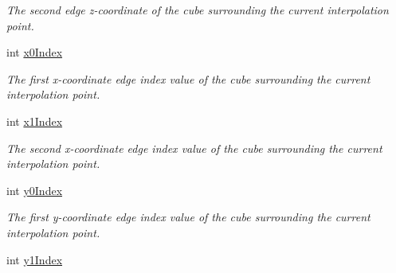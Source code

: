 \begin{DoxyCompactItemize}
\begin{DoxyCompactList}\small\item\em The second edge z-\/coordinate of the cube surrounding the current interpolation point. \item\end{DoxyCompactList}\item 
\hypertarget{classassignment_1_1_interpolator3_d_a5f5958cc28894f071c910f3a6950b4a7}{
int \hyperlink{classassignment_1_1_interpolator3_d_a5f5958cc28894f071c910f3a6950b4a7}{x0Index}}
\label{classassignment_1_1_interpolator3_d_a5f5958cc28894f071c910f3a6950b4a7}

\begin{DoxyCompactList}\small\item\em The first x-\/coordinate edge index value of the cube surrounding the current interpolation point. \item\end{DoxyCompactList}\item 
\hypertarget{classassignment_1_1_interpolator3_d_ae1801f9719cc067f46cc4dbad850584e}{
int \hyperlink{classassignment_1_1_interpolator3_d_ae1801f9719cc067f46cc4dbad850584e}{x1Index}}
\label{classassignment_1_1_interpolator3_d_ae1801f9719cc067f46cc4dbad850584e}

\begin{DoxyCompactList}\small\item\em The second x-\/coordinate edge index value of the cube surrounding the current interpolation point. \item\end{DoxyCompactList}\item 
\hypertarget{classassignment_1_1_interpolator3_d_a510c7513371c0a901b5d382dda2eb522}{
int \hyperlink{classassignment_1_1_interpolator3_d_a510c7513371c0a901b5d382dda2eb522}{y0Index}}
\label{classassignment_1_1_interpolator3_d_a510c7513371c0a901b5d382dda2eb522}

\begin{DoxyCompactList}\small\item\em The first y-\/coordinate edge index value of the cube surrounding the current interpolation point. \item\end{DoxyCompactList}\item 
\hypertarget{classassignment_1_1_interpolator3_d_a7915e8474ca9f2d24a6db89a4e6392aa}{
int \hyperlink{classassignment_1_1_interpolator3_d_a7915e8474ca9f2d24a6db89a4e6392aa}{y1Index}}
\label{classassignment_1_1_interpolator3_d_a7915e8474ca9f2d24a6db89a4e6392aa}


\end{DoxyCompactItemize}
